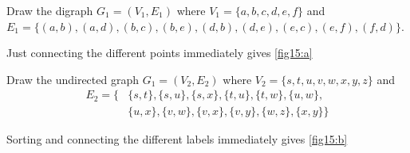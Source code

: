 \documentclass[a4paper, english, 12pt]{article} %
\begin{document}
\begin{problem}[15]
  \begin{subproblem}
    Draw the digraph $G_1 = (V_1, E_1)$ where $V_1 = \{a,b,c,d,e,f\}$ and \\ $E_1 =
    \{(a,b), (a,d), (b,c), (b,e), (d,b), (d,e), (e,c), (e,f), (f,d)\}$.
  \end{subproblem} 
\end{problem}

\begin{answer}
  Just connecting the different points immediately gives \cref{fig15:a}
\end{answer}

\begin{FigureH}
  \centering
  \caption{}
  \label{fig15:a}
\end{FigureH}

\begin{subproblem}
  Draw the undirected graph $G_1 = (V_2, E_2)$ where $V_2 = \{s,t,u,v,w,x,y,z\}$
  and
  \begin{align*}
  E_2 = \{ & \{s,t\}, \{s,u\}, \{s,x\}, \{t,u\}, \{t,w\}, \{u,w\}, \\
           & \{u,x\}, \{v,w\}, \{v,x\}, \{v,y\}, \{w,z\}, \{x,y\} \}
  \end{align*}
\end{subproblem}

\begin{answer}
  Sorting and connecting the different labels immediately gives \cref{fig15:b} 
\end{answer}
\end{document}
